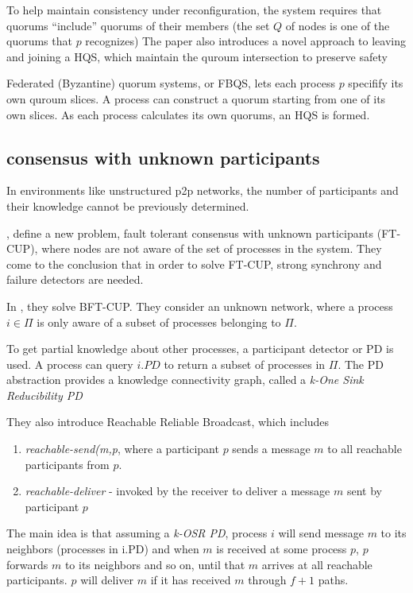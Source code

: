 \documentclass[fleqn,10pt]{olplainarticle}
\begin{document}
 To help maintain consistency under reconfiguration, the system requires that quorums “include” quorums of their members (the set $Q$ of nodes is one of the quorums that $p$ recognizes)
The paper also introduces a novel approach to leaving and joining a HQS, which maintain the quroum intersection to preserve safety 


Federated (Byzantine) quorum systems, or FBQS, lets each process $p$ specifify its own quroum slices. A process can construct a quorum starting from one
of its own slices. As each process calculates its own quorums, an HQS is formed. 
 


\subsection{consensus with unknown participants}

In environments like unstructured p2p networks, the number of participants and their knowledge cannot be previously determined. 

\cite{cup}, define a new problem, fault tolerant consensus with unknown participants (FT-CUP), where nodes are not aware of the set of processes in the system. 
They come to the conclusion that in order to solve FT-CUP, strong synchrony and failure detectors are needed. 

In \cite{alchieri2008byzantine}, they solve BFT-CUP. They consider an unknown network, where a process $i\in\Pi$ is only aware of a subset of processes belonging to $\Pi$. 

To get partial knowledge about other processes, a participant detector or PD is used. A process can query $i.PD$ to return a subset of processes in $\Pi$. The PD abstraction provides a knowledge connectivity graph, called a \textit{k-One Sink Reducibility PD}

They also introduce Reachable Reliable Broadcast, which includes 
\begin{enumerate}
    \item \textit{reachable-send(m,p}, where a participant $p$ sends a message $m$ to all reachable participants from $p$. 

    \item 
    \textit{reachable-deliver} - invoked by the receiver to deliver a message $m$ sent by participant $p$

\end{enumerate}

The main idea is that assuming a \textit{k-OSR PD}, process $i$ will send message $m$ to its neighbors (processes in i.PD)  and when $m$ is received at some process $p$, $p$ forwards $m$ to its neighbors and so on, until that $m$ arrives at all reachable participants. $p$ will deliver $m$ if it has received $m$ through $f+1$ paths. 
\end{document}
